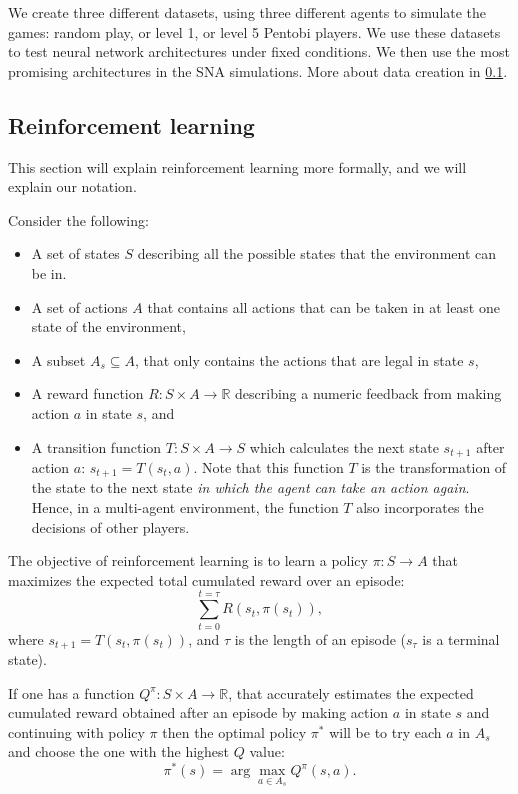 \documentclass{article}
\begin{document}
We create three different datasets, using three different
agents to simulate the games: random play, or level 1, or
level 5 Pentobi players. We use these datasets to test neural
network architectures under fixed conditions. We then use the
most promising architectures in the SNA simulations. More about
data creation in \ref{}.

\subsection{Reinforcement learning}
This section will explain reinforcement learning more formally,
and we will explain our notation.

\noindent Consider the following:
\begin{itemize}
\item A set of states $S$ describing all the possible
states that the environment can be in.
\item A set of actions $A$ that contains all actions that
can be taken in at least one state of the environment,
\item A subset $A_s \subseteq A$, that only contains the
actions that are legal in state $s$,
\item A reward function $R: S\times A \rightarrow \mathbb{R}$
describing a numeric feedback from making action $a$ in state $s$, and
\item A transition function $T : S\times A \rightarrow S$ which
calculates the next state $s_{t+1}$ after action
$a$: $s_{t+1} = T(s_t,a)$. Note that this function $T$ is
the transformation of the state to the next state
\emph{in which the agent can take an action again}.
Hence, in a multi-agent environment, the function $T$
also incorporates the decisions of other players.
\end{itemize}
The objective of reinforcement learning is to learn a
policy $\pi : S \rightarrow A$ that maximizes the expected
total cumulated reward over an episode:
$$\sum_{t=0}^{t=\tau}R(s_t,\pi(s_t)),$$ where
$s_{t+1}=T(s_t,\pi(s_t))$, and $\tau$ is the length of
an episode ($s_\tau$ is a terminal state).

If one has a function $Q^{\pi} : S\times A \rightarrow \mathbb{R}$,
that accurately estimates the expected cumulated reward obtained
after an episode by making action $a$ in state $s$ and continuing
with policy $\pi$ then the optimal policy $\pi^*$ will be to try
each $a$ in $A_s$ and choose the one with the highest $Q$ value:
$$\pi^{*}(s) = \arg\!\max_{a \in A_s} Q^\pi(s,a).$$
\end{document}
